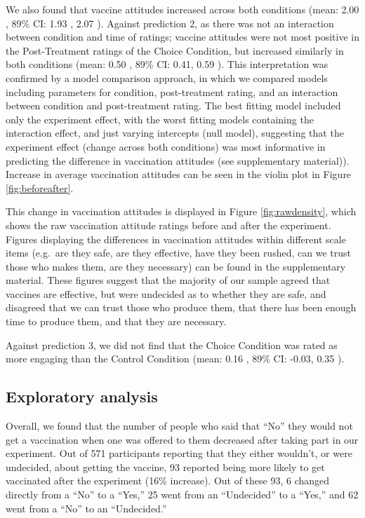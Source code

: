 \documentclass[
  english,
  ,jou,floatsintext]{apa6}
\begin{document}
We also found that vaccine attitudes increased across both conditions (mean: 2.00 , 89\% CI: 1.93 , 2.07 ). Against prediction 2, as there was not an interaction between condition and time of ratings; vaccine attitudes were not most positive in the Post-Treatment ratings of the Choice Condition, but increased similarly in both conditions (mean: 0.50 , 89\% CI: 0.41, 0.59 ). This interpretation was confirmed by a model comparison approach, in which we compared models including parameters for condition, post-treatment rating, and an interaction between condition and post-treatment rating. The best fitting model included only the experiment effect, with the worst fitting models containing the interaction effect, and just varying intercepts (null model), suggesting that the experiment effect (change across both conditions) was most informative in predicting the difference in vaccination attitudes (see supplementary material)). Increase in average vaccination attitudes can be seen in the violin plot in Figure \ref{fig:beforeafter}.

This change in vaccination attitudes is displayed in Figure \ref{fig:rawdensity}, which shows the raw vaccination attitude ratings before and after the experiment. Figures displaying the differences in vaccination attitudes within different scale items (e.g.~are they safe, are they effective, have they been rushed, can we trust those who makes them, are they necessary) can be found in the supplementary material. These figures suggest that the majority of our sample agreed that vaccines are effective, but were undecided as to whether they are safe, and disagreed that we can trust those who produce them, that there has been enough time to produce them, and that they are necessary.

Against prediction 3, we did not find that the Choice Condition was rated as more engaging than the Control Condition (mean: 0.16 , 89\% CI: -0.03, 0.35 ).

\hypertarget{exploratory-analysis}{%
\subsection{Exploratory analysis}\label{exploratory-analysis}}

Overall, we found that the number of people who said that ``No'' they would not get a vaccination when one was offered to them decreased after taking part in our experiment. Out of 571 participants reporting that they either wouldn't, or were undecided, about getting the vaccine, 93 reported being more likely to get vaccinated after the experiment (16\% increase). Out of these 93, 6 changed directly from a ``No'' to a ``Yes,'' 25 went from an ``Undecided'' to a ``Yes,'' and 62 went from a ``No'' to an ``Undecided.''
\end{document}
